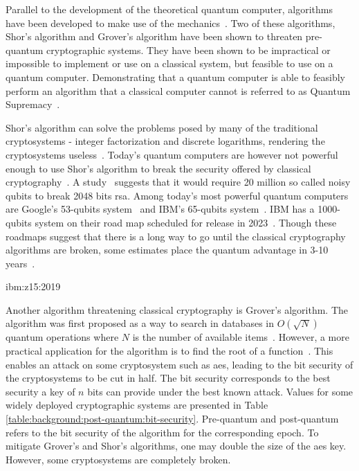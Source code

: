 
Parallel to the development of the theoretical quantum computer, algorithms have been developed to make use of the mechanics~\cite{shor1997, jordan2021}. Two of these algorithms, Shor's algorithm and Grover's algorithm have been shown to threaten pre-quantum cryptographic systems. They have been shown to be impractical or impossible to implement or use on a classical system, but feasible to use on a quantum computer. Demonstrating that a quantum computer is able to feasibly perform an algorithm that a classical computer cannot is referred to as Quantum Supremacy~\cite{farhi2019}.

Shor's algorithm can solve the problems posed by many of the traditional cryptosystems - integer factorization and discrete logarithms, rendering the cryptosystems useless~\cite{shor1997}. Today's quantum computers are however not powerful enough to use Shor's algorithm to break the security offered by classical cryptography~\cite{bernstein2017}. A study~\cite{gidney2019} suggests that it would require 20 million so called noisy \glspl{qubit} to break 2048 bits \gls{rsa}. Among today's most powerful quantum computers are Google's 53-\glspl{qubit} system~\cite{google2019:quantum-computer} and IBM's 65-\glspl{qubit} system~\cite{ibm2020:quantum-computer}. IBM has a 1000-\glspl{qubit} system on their road map scheduled for release in 2023~\cite{ibm2020:quantum-computer}. Though these roadmaps suggest that there is a long way to go until the classical cryptography algorithms are broken, some estimates place the quantum advantage in 3-10 years~\cite{ibm:z15:2019, microsoft2020}. 

ibm:z15:2019

Another algorithm threatening classical cryptography is Grover's algorithm. The algorithm was first proposed as a way to search in databases in $O(\sqrt N)$ quantum operations where $N$ is the number of available items~\cite{grover1996}. However, a more practical application for the algorithm is to find the root of a function~\cite{bernstein2017}. This enables an attack on some cryptosystem such as \gls{aes}, leading to the bit security of the cryptosystems to be cut in half. The bit security corresponds to the best security a key of $n$ bits can provide under the best known attack. Values for some widely deployed cryptographic systems are presented in Table \ref{table:background:post-quantum:bit-security}. Pre-quantum and post-quantum refers to the bit security of the algorithm for the corresponding epoch. To mitigate Grover's and Shor's algorithms, one may double the size of the \gls{aes} key. However, some cryptosystems are completely broken.

